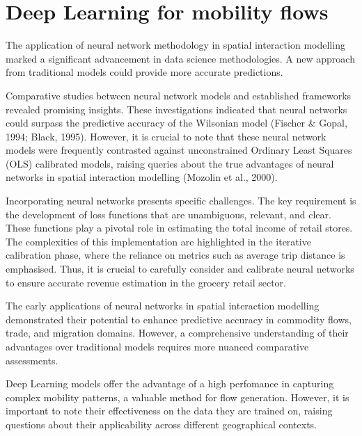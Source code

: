     \section{Deep Learning for mobility flows}

    The application of neural network methodology in spatial interaction modelling marked a significant advancement in data science methodologies. A new approach from traditional models could provide more accurate predictions. \citep{wilkinsonSpatialInteractionModels2023}
        
    Comparative studies between neural network models and established frameworks revealed promising insights. These investigations indicated that neural networks could surpass the predictive accuracy of the Wilsonian model \citep{} (Fischer \& Gopal, 1994; Black, 1995). However, it is crucial to note that these neural network models were frequently contrasted against unconstrained Ordinary Least Squares (OLS) calibrated models, raising queries about the true advantages of neural networks in spatial interaction modelling (Mozolin et al., 2000). \citep{wilkinsonSpatialInteractionModels2023}
        
    Incorporating neural networks presents specific challenges. The key requirement is the development of loss functions that are unambiguous, relevant, and clear. These functions play a pivotal role in estimating the total income of retail stores. The complexities of this implementation are highlighted in the iterative calibration phase, where the reliance on metrics such as average trip distance is emphasised. Thus, it is crucial to carefully consider and calibrate neural networks to ensure accurate revenue estimation in the grocery retail sector. \citep{wilkinsonSpatialInteractionModels2023}
        
    The early applications of neural networks in spatial interaction modelling demonstrated their potential to enhance predictive accuracy in commodity flows, trade, and migration domains. However, a comprehensive understanding of their advantages over traditional models requires more nuanced comparative assessments\citep{wilkinsonSpatialInteractionModels2023}.

    Deep Learning models offer the advantage of a high perfomance in capturing complex mobility patterns, a valuable method for flow generation. However, it is important to note their effectiveness on the data they are trained on, raising questions about their applicability across different geographical contexts. \citep{wilkinsonSpatialInteractionModels2023}

